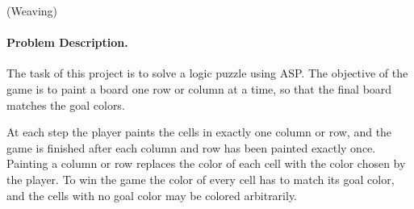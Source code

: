 \documentclass[a4paper,12pt]{article}
\begin{document}
\begin{PraktikumsAufgabe}{2}{(Weaving)}
\vspace*{-4mm}
\paragraph{Problem Description.}
%
%
The task of this project is to solve a logic puzzle using ASP.
The objective of the game is to paint a board one row or column at a time, 
so that the final board matches the goal colors.

At each step the player paints the cells in exactly one column or row, 
and the game is finished after each column and row has been painted exactly once.
Painting a column or row replaces the color of each cell with the color chosen by the player.
To win the game the color of every cell has to match its goal color,
and the cells with no goal color may be colored arbitrarily.


\end{PraktikumsAufgabe}
\end{document}
